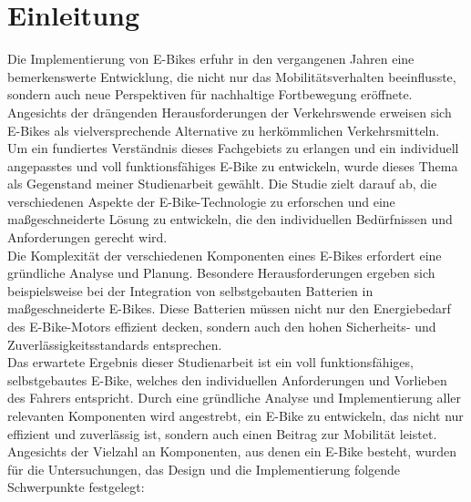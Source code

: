 
\chapter{Einleitung}

Die Implementierung von E-Bikes erfuhr in den vergangenen Jahren eine bemerkenswerte Entwicklung, die nicht nur das Mobilitätsverhalten beeinflusste, sondern auch neue Perspektiven für nachhaltige Fortbewegung eröffnete.
Angesichts der drängenden Herausforderungen der Verkehrswende erweisen sich E-Bikes als vielversprechende Alternative zu herkömmlichen Verkehrsmitteln.\\

Um ein fundiertes Verständnis dieses Fachgebiets zu erlangen und ein individuell angepasstes und voll funktionsfähiges E-Bike zu entwickeln, wurde dieses Thema als Gegenstand meiner Studienarbeit gewählt.
Die Studie zielt darauf ab, die verschiedenen Aspekte der E-Bike-Technologie zu erforschen und eine maßgeschneiderte Lösung zu entwickeln, die den individuellen Bedürfnissen und Anforderungen gerecht wird.\\

Die Komplexität der verschiedenen Komponenten eines E-Bikes erfordert eine gründliche Analyse und Planung.
Besondere Herausforderungen ergeben sich beispielsweise bei der Integration von selbstgebauten Batterien in maßgeschneiderte E-Bikes.
Diese Batterien müssen nicht nur den Energiebedarf des E-Bike-Motors effizient decken, sondern auch den hohen Sicherheits- und Zuverlässigkeitsstandards entsprechen.\\

Das erwartete Ergebnis dieser Studienarbeit ist ein voll funktionsfähiges, selbstgebautes E-Bike, welches den individuellen Anforderungen und Vorlieben des Fahrers entspricht.
Durch eine gründliche Analyse und Implementierung aller relevanten Komponenten wird angestrebt, ein E-Bike zu entwickeln, das nicht nur effizient und zuverlässig ist, sondern auch einen Beitrag zur Mobilität leistet.\\

Angesichts der Vielzahl an Komponenten, aus denen ein E-Bike besteht, wurden für die Untersuchungen, das Design und die Implementierung folgende Schwerpunkte festgelegt:


